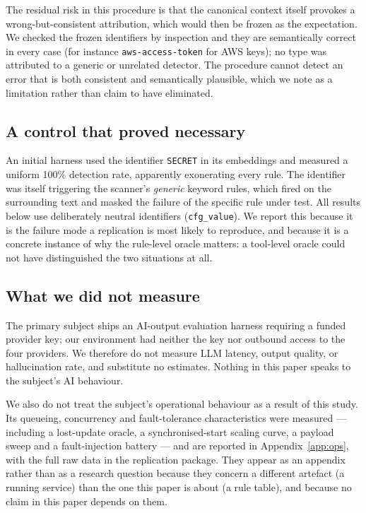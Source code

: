 \documentclass[journal]{IEEEtran}
\begin{document}
The residual risk in this procedure is that the canonical context itself provokes a wrong-but-consistent attribution, which would then be frozen as the expectation. We checked the frozen identifiers by inspection and they are semantically correct in every case (for instance \texttt{aws-access-token} for AWS keys); no type was attributed to a generic or unrelated detector. The procedure cannot detect an error that is both consistent and semantically plausible, which we note as a limitation rather than claim to have eliminated.

\subsection{A control that proved necessary}
\label{sec:control}

An initial harness used the identifier \texttt{SECRET} in its embeddings and measured a uniform 100\% detection rate, apparently exonerating every rule. The identifier was itself triggering the scanner's \emph{generic} keyword rules, which fired on the surrounding text and masked the failure of the specific rule under test. All results below use deliberately neutral identifiers (\texttt{cfg\_value}). We report this because it is the failure mode a replication is most likely to reproduce, and because it is a concrete instance of why the rule-level oracle matters: a tool-level oracle could not have distinguished the two situations at all.

\subsection{What we did not measure}
\label{sec:notmeasured}

The primary subject ships an AI-output evaluation harness requiring a funded provider key; our environment had neither the key nor outbound access to the four providers. We therefore do not measure LLM latency, output quality, or hallucination rate, and substitute no estimates. Nothing in this paper speaks to the subject's AI behaviour.

We also do not treat the subject's operational behaviour as a result of this study. Its queueing, concurrency and fault-tolerance characteristics were measured --- including a lost-update oracle, a synchronised-start scaling curve, a payload sweep and a fault-injection battery --- and are reported in Appendix~\ref{app:ops}, with the full raw data in the replication package. They appear as an appendix rather than as a research question because they concern a different artefact (a running service) than the one this paper is about (a rule table), and because no claim in this paper depends on them.
\end{document}
